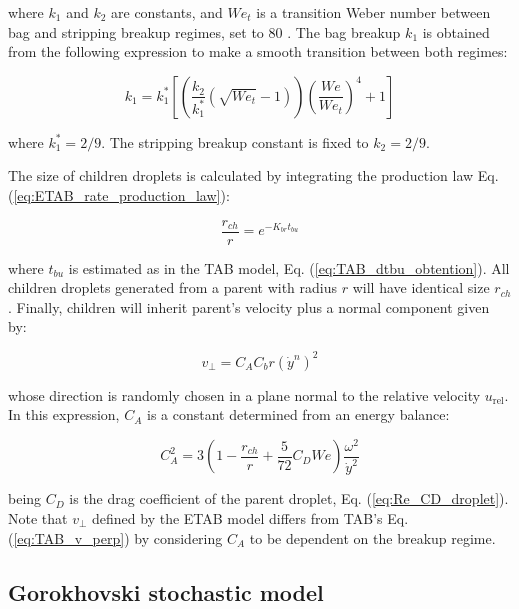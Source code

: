 where $k_1$ and $k_2$ are constants, and $We_t$ is a transition Weber number between bag and stripping breakup regimes, set to 80 . The bag breakup $k_1$ is obtained from the following expression to make a smooth transition between both regimes:

\begin{equation}
k_1 = k_1^* \left[\left(  \frac{k_2}{k_1^*} \left( \sqrt{We_t} - 1 \right) \right) \left( \frac{We}{We_t} \right)^4 + 1 \right]
\end{equation}

where $k_1^* = 2/9$. The stripping breakup constant is fixed to $k_2 = 2/9$.

The size of children droplets is calculated by integrating the production law Eq. (\ref{eq:ETAB_rate_production_law}):

\begin{equation}
\label{eq:ETAB_model_radius_ratio}
\frac{r_{ch}}{r} = e ^{-K_{br} t_{bu}}
\end{equation}

where $t_{bu}$ is estimated as in the TAB model, Eq. (\ref{eq:TAB_dtbu_obtention}). All children droplets generated from a parent with radius $r$ will have identical size $r_{ch}$. Finally, children will inherit parent's velocity plus a normal component given by:

\begin{equation}
v_\perp = C_A C_b r \left(\dot{y}^n\right)^2 
\end{equation}

whose direction is randomly chosen in a plane normal to the relative velocity $u_\mathrm{rel}$. In this expression, $C_A$ is a constant determined from an energy balance:

\begin{equation}
C_A^2 = 3 \left( 1 - \frac{r_{ch}}{r} + \frac{5}{72} C_D We \right) \frac{\omega^2}{\dot{y}^2}
\end{equation}

being $C_D$ is the drag coefficient of the parent droplet, Eq. (\ref{eq:Re_CD_droplet}). Note that $v_\perp$ defined by the ETAB model differs from TAB's Eq. (\ref{eq:TAB_v_perp}) by considering $C_A$ to be dependent on the breakup regime.


\subsection{Gorokhovski stochastic model}
\label{subsec:ch4_goro_model}

